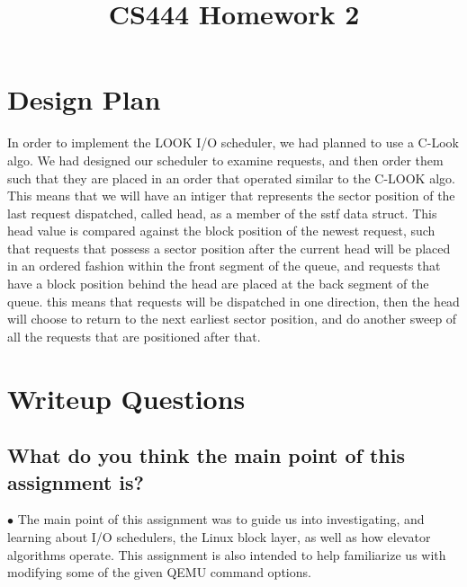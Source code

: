 \documentclass[letterpaper,10pt,fleqn,draftclsnofoot,onecolumn]{IEEEtran}
\title{CS444 Homework 2}
\author{\name}
\begin{document}
	\maketitle
	\hrulefill
	\section*{Design Plan}
	In order to implement the LOOK I/O scheduler, we had planned to use a C-Look algo. We had designed our scheduler to examine requests, and then order them such that they are placed in an order that operated similar to the C-LOOK  algo. This means that we will have an intiger that represents the sector position of the last request dispatched, called head, as a member of the sstf data struct. This head value is compared against the block position of the newest request, such that requests that possess a sector position after the current head will be placed in an ordered fashion within the front segment of the queue, and requests that have a block position behind the head are placed at the back segment of the queue. this means that requests will be dispatched in one direction, then the head will choose to return to the next earliest sector position, and do another sweep of all the requests that are positioned after that.
	
	\section*{Writeup Questions}
	
	\subsection{What do you think the main point of this assignment is?}
	$\bullet$ The main point of this assignment was to guide us into investigating, and learning about I/O schedulers, the Linux block layer, as well as how elevator algorithms operate. This assignment is also intended to help familiarize us with modifying some of the given QEMU command options.
	
\end{document}
